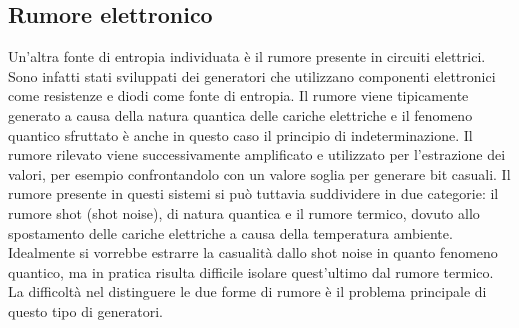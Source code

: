 \subsection{Rumore elettronico}
Un'altra fonte di entropia individuata è il rumore presente in circuiti elettrici. Sono infatti stati sviluppati dei generatori che utilizzano componenti elettronici come resistenze e diodi come fonte di entropia. Il rumore viene tipicamente generato a causa della natura quantica delle cariche elettriche e il fenomeno quantico sfruttato è anche in questo caso il principio di indeterminazione. Il rumore rilevato viene successivamente amplificato e utilizzato per l'estrazione dei valori, per esempio confrontandolo con un valore soglia per generare bit casuali. Il rumore presente in questi sistemi si può tuttavia suddividere in due categorie: il rumore shot (shot noise), di natura quantica e il rumore termico, dovuto allo spostamento delle cariche elettriche a causa della temperatura ambiente. Idealmente si vorrebbe estrarre la casualità dallo shot noise in quanto fenomeno quantico, ma in pratica risulta difficile isolare quest'ultimo dal rumore termico. La difficoltà nel distinguere le due forme di rumore è il problema principale di questo tipo di generatori.

